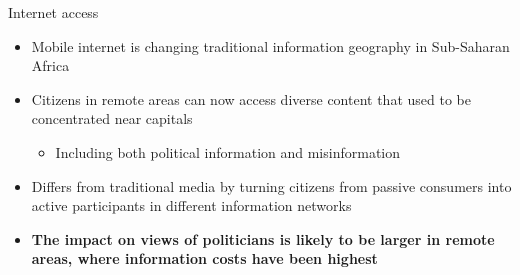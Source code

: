 \documentclass[aspectratio=169,xcolor=dvipsnames]{beamer}
\begin{document}
\begin{frame}{Internet access}
\begin{itemize}
\item Mobile internet is changing traditional information geography in Sub-Saharan Africa
\vfill
\item Citizens in remote areas can now access diverse content that used to be concentrated near capitals
\vfill\begin{itemize}
    \vfill
    \item Including both political information
and misinformation
\end{itemize}
\vfill
\item Differs from traditional media by turning citizens from passive
consumers into active participants in different information networks
\vfill
\item \textcolor[RGB]{220, 10, 10}{\textbf{The impact on views of politicians is likely
to be larger in remote areas, where information costs have been highest}}
\end{itemize}
\end{frame}
\end{document}

